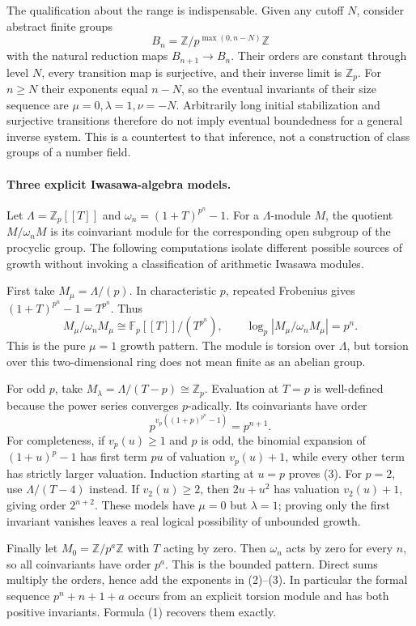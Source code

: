 \documentclass[11pt]{article}
\begin{document}
The qualification about the range is indispensable. Given any cutoff
$N$, consider abstract finite groups
\[
 B_n=\mathbb Z/p^{\max(0,n-N)}\mathbb Z
\]
with the natural reduction maps $B_{n+1}\to B_n$. Their orders are
constant through level $N$, every transition map is surjective, and
their inverse limit is $\mathbb Z_p$. For $n\ge N$ their exponents
equal $n-N$, so the eventual invariants of their size sequence are
$\mu=0,\lambda=1,\nu=-N$. Arbitrarily long initial stabilization and
surjective transitions therefore do not imply eventual boundedness
for a general inverse system. This is a countertest to that inference,
not a construction of class groups of a number field.

\paragraph{Three explicit Iwasawa-algebra models.}
Let $\Lambda=\mathbb Z_p[[T]]$ and
$\omega_n=(1+T)^{p^n}-1$. For a $\Lambda$-module $M$, the quotient
$M/\omega_n M$ is its coinvariant module for the corresponding open
subgroup of the procyclic group. The following computations isolate
different possible sources of growth without invoking a classification
of arithmetic Iwasawa modules.

First take $M_\mu=\Lambda/(p)$. In characteristic $p$, repeated
Frobenius gives $(1+T)^{p^n}-1=T^{p^n}$. Thus
\[
 M_\mu/\omega_nM_\mu\cong
 \mathbb F_p[[T]]/(T^{p^n}),\qquad
 \log_p|M_\mu/\omega_nM_\mu|=p^n.                  \tag{2}
\]
This is the pure $\mu=1$ growth pattern. The module is torsion over
$\Lambda$, but torsion over this two-dimensional ring does not mean
finite as an abelian group.

For odd $p$, take $M_\lambda=\Lambda/(T-p)\cong\mathbb Z_p$.
Evaluation at $T=p$ is well-defined because the power series converges
$p$-adically. Its coinvariants have order
\[
 p^{v_p((1+p)^{p^n}-1)}=p^{n+1}.                    \tag{3}
\]
For completeness, if $v_p(u)\ge1$ and $p$ is odd, the binomial
expansion of $(1+u)^p-1$ has first term $pu$ of valuation
$v_p(u)+1$, while every other term has strictly larger valuation.
Induction starting at $u=p$ proves (3). For $p=2$, use
$\Lambda/(T-4)$ instead. If $v_2(u)\ge2$, then $2u+u^2$ has valuation
$v_2(u)+1$, giving order $2^{n+2}$. These models have $\mu=0$ but
$\lambda=1$; proving only the first invariant vanishes leaves a real
logical possibility of unbounded growth.

Finally let $M_0=\mathbb Z/p^a\mathbb Z$ with $T$ acting by zero.
Then $\omega_n$ acts by zero for every $n$, so all coinvariants have
order $p^a$. This is the bounded pattern. Direct sums multiply the
orders, hence add the exponents in (2)--(3). In particular the formal
sequence $p^n+n+1+a$ occurs from an explicit torsion module and has
both positive invariants. Formula (1) recovers them exactly.
\end{document}
